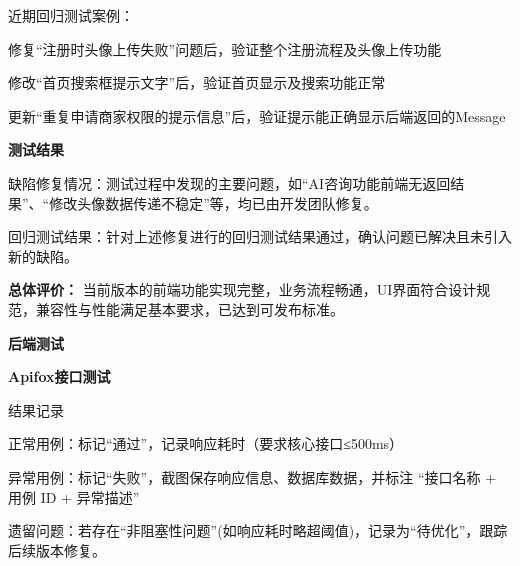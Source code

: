 \begin{levellist}
\begin{levellist}
\begin{levellist}
            近期回归测试案例：
            \begin{levellist}
                \item 修复“注册时头像上传失败”问题后，验证整个注册流程及头像上传功能
                \item 修改“首页搜索框提示文字”后，验证首页显示及搜索功能正常
                \item 更新“重复申请商家权限的提示信息”后，验证提示能正确显示后端返回的Message
            \end{levellist}

        \end{levellist}

        \item \textbf{测试结果}
        \begin{levellist}
            \item 缺陷修复情况：测试过程中发现的主要问题，如“AI咨询功能前端无返回结果”、“修改头像数据传递不稳定”等，均已由开发团队修复。
            \item 回归测试结果：针对上述修复进行的回归测试结果通过，确认问题已解决且未引入新的缺陷。
            \item \textbf{总体评价：} 当前版本的前端功能实现完整，业务流程畅通，UI界面符合设计规范，兼容性与性能满足基本要求，已达到可发布标准。
        \end{levellist}

    \end{levellist}


    \item \textbf{后端测试}
    \begin{levellist}
        \item \textbf{Apifox接口测试}
        \begin{levellist}
            \item 结果记录
            \begin{levellist}
                \item 正常用例：标记“通过”，记录响应耗时（要求核心接口≤500ms）
                \item 异常用例：标记“失败”，截图保存响应信息、数据库数据，并标注 “接口名称 + 用例 ID + 异常描述”
                \item 遗留问题：若存在“非阻塞性问题”(如响应耗时略超阈值)，记录为“待优化”，跟踪后续版本修复。
            \end{levellist}


\end{levellist}
\end{levellist}
\end{levellist}
